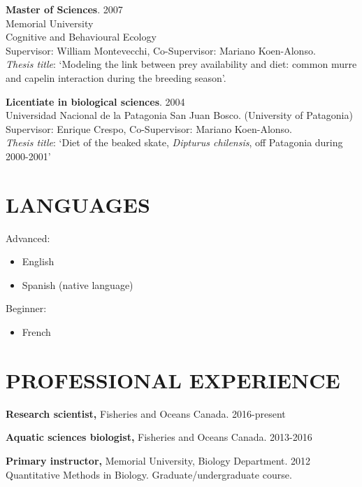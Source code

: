 \documentclass{res}
\begin{document}
\begin{resume}
\textbf{Master of Sciences}. 2007 \\
Memorial University \\
Cognitive and Behavioural Ecology \\
Supervisor: William Montevecchi, Co-Supervisor: Mariano Koen-Alonso.\\
\textit{Thesis title}: ‘Modeling the link between prey availability and diet: common murre and capelin interaction during the breeding season’.

\textbf{Licentiate in biological sciences}. 2004\\
Universidad Nacional de la Patagonia San Juan Bosco.
(University of Patagonia) \\
Supervisor: Enrique Crespo, Co-Supervisor: Mariano Koen-Alonso.\\
\textit{Thesis title}: ‘Diet of the beaked skate, \textit{Dipturus chilensis}, off Patagonia during 2000-2001’


\section{LANGUAGES}
Advanced:
\begin{itemize}
	\item[] English
	\item[] Spanish (native language)
\end{itemize}
Beginner:
\begin{itemize}
	\item[] French
\end{itemize}


 

 
 

\section{PROFESSIONAL EXPERIENCE}
\vspace{0.1in}
	
\textbf{Research scientist,} Fisheries and Oceans Canada. 2016-present

\textbf{Aquatic sciences biologist,} Fisheries and Oceans Canada. 2013-2016

\textbf{Primary instructor,} Memorial University, Biology Department. 2012 \\ Quantitative Methods in Biology. Graduate/undergraduate course. 


\end{resume}
\end{document}
